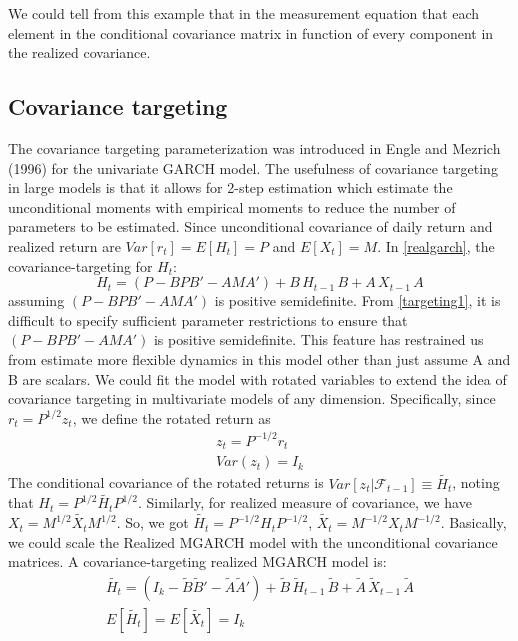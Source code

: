 \documentclass[titlepage,11pt]{article}
\begin{document}
We could tell from this example that in the measurement equation that each element in the conditional covariance matrix in function of every component in the realized covariance. 




\subsection{Covariance targeting}
The covariance targeting parameterization was introduced in Engle and Mezrich (1996) for the univariate GARCH model. The usefulness of covariance targeting in large models is that it allows for 2-step estimation which estimate the unconditional moments with empirical moments to reduce the number of parameters to be estimated.
Since unconditional covariance of daily return and realized return are $Var[r_t]=E[H_t]=P$ and $E[X_t]=M$. In \ref{realgarch}, the covariance-targeting for $H_t$:
\begin{equation}
\label{targeting1}
H_t=(P-BPB'-AMA')+ B\,  H_{t-1} \,B+A \,  X_{t-1} \, A
\end{equation}
assuming $(P-BPB'-AMA')$ is positive semidefinite. From \ref{targeting1}, it is difficult to specify sufficient parameter restrictions to ensure that $(P-BPB'-AMA')$ is positive semidefinite. This feature has restrained us from estimate more flexible dynamics in this model other than just assume A and B are scalars.
We could fit the model with rotated variables to extend the idea of covariance targeting in multivariate models of any dimension. Specifically, since $r_t = P^{1/2}z_t$, we define the rotated return as 
\begin{align}
\label{rotate}
z_t = P^{-1/2}r_t \nonumber \\
Var(z_t)=I_k
\end{align}
The conditional covariance of the rotated returns is $Var[z_t|\mathcal{F}_{t-1}]\equiv \tilde{H_t}$, noting that $H_t = P^{1/2}\tilde{H_t}P^{1/2}$. Similarly, for realized measure of covariance, we have $X_t = M^{1/2}\tilde{X_t}M^{1/2}$. So, we got $\tilde{H_t} = P^{-1/2} H_t P^{-1/2}$, $\tilde{X_t} = M^{-1/2} X_t M^{-1/2}$. Basically, we could scale the Realized MGARCH model with the unconditional covariance matrices. A covariance-targeting realized MGARCH model is:
\begin{align}
\label{targeting2}
\tilde{H_t}=(I_k-\tilde{B}\tilde{B}'-\tilde{A}\tilde{A}')+ \tilde{B}\,  \tilde{H}_{t-1} \,\tilde{B} + \tilde{A} \,  \tilde{X}_{t-1} \, \tilde{A}  \\
E[\tilde{H_t}]=E[\tilde{X_t}]=I_k \nonumber
\end{align}
\end{document}
